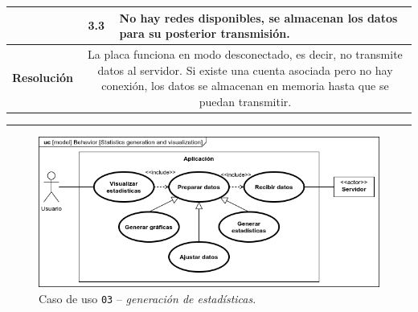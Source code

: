 \begin{table}[H]
\begin{tabularx}{\textwidth}{|c|c|X|}
    \cline{2-3}
                                                & 3.3                                                                                                                                                                                                                          & \multicolumn{1}{L|}{No hay redes disponibles, se almacenan los datos para su posterior transmisión.}                                                         \\
    \hline\hline
    \textbf{Resolución}                         & \multicolumn{2}{X|}{La placa funciona en modo desconectado, es decir, no transmite datos al servidor. Si existe una cuenta asociada pero no hay conexión, los datos se almacenan en memoria hasta que se puedan transmitir.}                                                                                                                                                                \\
    \hline
  \end{tabularx}
\end{table}

\noindent\rule{\linewidth}{.2pt}

\begin{figure}[H]
  \centering
  \includegraphics[width=\linewidth]{diagrams/UseCases-UC3 - stats.png}
  \caption{Caso de uso \texttt{03} -- \textit{generación de estadísticas}.}
  \label{uc:stats}
\end{figure}

